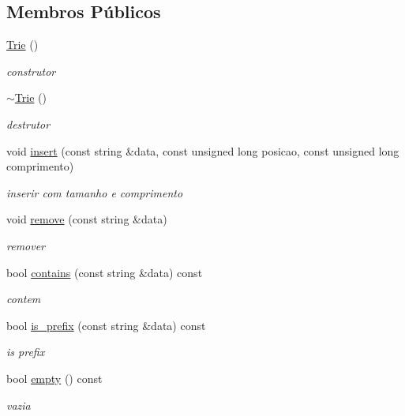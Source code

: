 \subsection*{Membros Públicos}
\begin{DoxyCompactItemize}
\item 
\mbox{\hyperlink{classstructures_1_1Trie_af6cf71564b040dfc62bbdedbbab8271a}{Trie}} ()
\begin{DoxyCompactList}\small\item\em construtor \end{DoxyCompactList}\item 
\mbox{\hyperlink{classstructures_1_1Trie_afc4b294e25004ee33d37a044cad6d342}{$\sim$\+Trie}} ()
\begin{DoxyCompactList}\small\item\em destrutor \end{DoxyCompactList}\item 
void \mbox{\hyperlink{classstructures_1_1Trie_a9a580a15a1582b408aa776d7539ea452}{insert}} (const string \&data, const unsigned long posicao, const unsigned long comprimento)
\begin{DoxyCompactList}\small\item\em inserir com tamanho e comprimento \end{DoxyCompactList}\item 
void \mbox{\hyperlink{classstructures_1_1Trie_af6f528e22594b9b83bc78b81fdc88fd0}{remove}} (const string \&data)
\begin{DoxyCompactList}\small\item\em remover \end{DoxyCompactList}\item 
bool \mbox{\hyperlink{classstructures_1_1Trie_a0b51abf86fd8e2302cf4b65f58982fb1}{contains}} (const string \&data) const
\begin{DoxyCompactList}\small\item\em contem \end{DoxyCompactList}\item 
bool \mbox{\hyperlink{classstructures_1_1Trie_a1a7dcbc0533cc7b1e5ab8ce517b75b6b}{is\+\_\+prefix}} (const string \&data) const
\begin{DoxyCompactList}\small\item\em is prefix \end{DoxyCompactList}\item 
bool \mbox{\hyperlink{classstructures_1_1Trie_a24bb9680f58b9c6879433adf8712c1ad}{empty}} () const
\begin{DoxyCompactList}\small\item\em vazia \end{DoxyCompactList}\item 

\end{DoxyCompactItemize}
